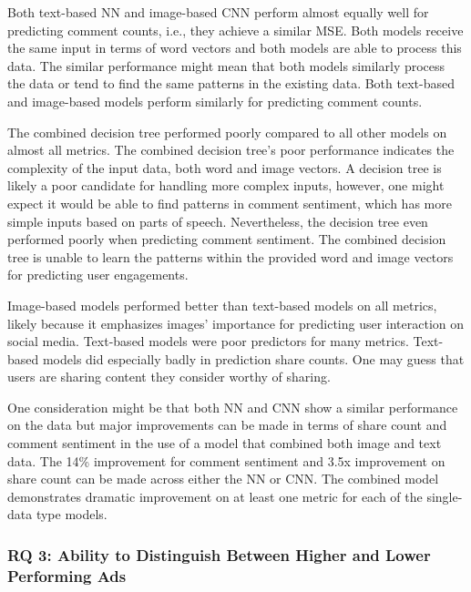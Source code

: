 \documentclass[mksc,blindrev]{informs3} %
\begin{document}
Both text-based NN and image-based CNN perform almost equally well for predicting comment counts, i.e., they achieve a similar MSE. Both models receive the same input in terms of word vectors and both models are able to process this data. The similar performance might mean that both models similarly process the data or tend to find the same patterns in the existing data. Both text-based and image-based models perform similarly for predicting comment counts.

The combined decision tree performed poorly compared to all other models on almost all metrics. The combined decision tree's poor performance indicates the complexity of the input data, both word and image vectors. A decision tree is likely a poor candidate for handling more complex inputs, however, one might expect it would be able to find patterns in comment sentiment, which has more simple inputs based on parts of speech. Nevertheless, the decision tree even performed poorly when predicting comment sentiment. The combined decision tree is unable to learn the patterns within the provided word and image vectors for predicting user engagements.

Image-based models performed better than text-based models on all metrics, likely because it emphasizes images' importance for predicting user interaction on social media. Text-based models were poor predictors for many metrics. Text-based models did especially badly in prediction share counts. One may guess that users are sharing content they consider worthy of sharing.

One consideration might be that both NN and CNN show a similar performance on the data but major improvements can be made in terms of share count and comment sentiment in the use of a model that combined both image and text data. The 14\% improvement for comment sentiment and 3.5x improvement on share count can be made across either the NN or CNN. The combined model demonstrates dramatic  improvement on at least one metric for each of the single-data type models.

\subsubsection{RQ 3: Ability to Distinguish Between Higher and Lower Performing Ads}
\end{document}
